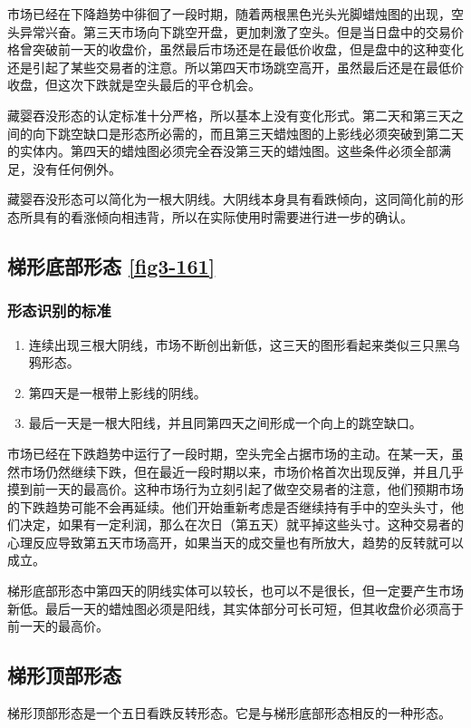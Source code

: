 市场已经在下降趋势中徘徊了一段时期，随着两根黑色光头光脚蜡烛图的出现，空头异常兴奋。第三天市场向下跳空开盘，更加刺激了空头。但是当日盘中的交易价格曾突破前一天的收盘价，虽然最后市场还是在最低价收盘，但是盘中的这种变化还是引起了某些交易者的注意。所以第四天市场跳空高开，虽然最后还是在最低价收盘，但这次下跌就是空头最后的平仓机会。

藏婴吞没形态的认定标准十分严格，所以基本上没有变化形式。第二天和第三天之间的向下跳空缺口是形态所必需的，而且第三天蜡烛图的上影线必须突破到第二天的实体内。第四天的蜡烛图必须完全吞没第三天的蜡烛图。这些条件必须全部满足，没有任何例外。

藏婴吞没形态可以简化为一根大阴线。大阴线本身具有看跌倾向，这同简化前的形态所具有的看涨倾向相违背，所以在实际使用时需要进行进一步的确认。
\subsection{梯形底部形态 \autoref{fig3-161}}
\subsubsection*{形态识别的标准}
\begin{enumerate}
    \item 连续出现三根大阴线，市场不断创出新低，这三天的图形看起来类似三只黑乌鸦形态。
    \item 第四天是一根带上影线的阴线。
    \item 最后一天是一根大阳线，并且同第四天之间形成一个向上的跳空缺口。
\end{enumerate}

市场已经在下跌趋势中运行了一段时期，空头完全占据市场的主动。在某一天，虽然市场仍然继续下跌，但在最近一段时期以来，市场价格首次出现反弹，并且几乎摸到前一天的最高价。这种市场行为立刻引起了做空交易者的注意，他们预期市场的下跌趋势可能不会再延续。他们开始重新考虑是否继续持有手中的空头头寸，他们决定，如果有一定利润，那么在次日（第五天）就平掉这些头寸。这种交易者的心理反应导致第五天市场高开，如果当天的成交量也有所放大，趋势的反转就可以成立。

梯形底部形态中第四天的阴线实体可以较长，也可以不是很长，但一定要产生市场新低。最后一天的蜡烛图必须是阳线，其实体部分可长可短，但其收盘价必须高于前一天的最高价。
\subsection{梯形顶部形态}
梯形顶部形态是一个五日看跌反转形态。它是与梯形底部形态相反的一种形态。
